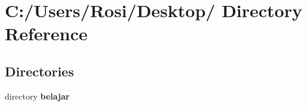 \section{C:/Users/Rosi/Desktop/ Directory Reference}
\label{dir_C_3A_2FUsers_2FRosi_2FDesktop_2F}


\subsection*{Directories}
\begin{CompactItemize}
\item 
directory {\bf belajar}
\end{CompactItemize}
